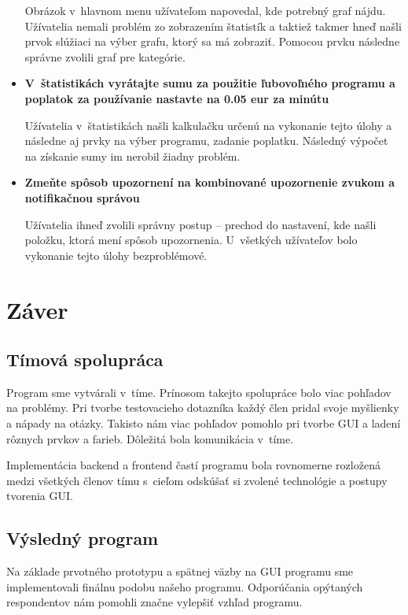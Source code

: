\documentclass[]{article}
\begin{document}
\begin{itemize}
	Obrázok v~hlavnom menu užívateľom napovedal, kde potrebný graf nájdu. Užívatelia nemali problém zo zobrazením štatistík a taktiež takmer hneď našli prvok slúžiaci na výber grafu, ktorý sa má zobraziť. Pomocou prvku následne správne zvolili graf pre kategórie.
	
	\item \textbf{V~štatistikách vyrátajte sumu za použitie ľubovoľného programu a poplatok za používanie nastavte na 0.05 eur za minútu}
	
	Užívatelia v~štatistikách našli kalkulačku určenú na vykonanie tejto úlohy a následne aj prvky na výber programu, zadanie poplatku. Následný výpočet na získanie sumy im nerobil žiadny problém.
	
	\item \textbf{Zmeňte spôsob upozornení na kombinované upozornenie zvukom a notifikačnou správou}
	
	Užívatelia ihneď zvolili správny postup -- prechod do nastavení, kde našli položku, ktorá mení spôsob upozornenia. U~všetkých užívateľov bolo vykonanie tejto úlohy bezproblémové.
	
	
\end{itemize}

\newpage

\section{Záver}

\subsection{Tímová spolupráca}
Program sme vytvárali v~tíme. Prínosom takejto spolupráce bolo viac pohľadov na problémy. Pri tvorbe testovacieho dotazníka každý člen pridal svoje myšlienky a nápady na otázky. Takisto nám viac pohľadov pomohlo pri tvorbe GUI a ladení rôznych prvkov a farieb. Dôležitá bola komunikácia v~tíme. 

Implementácia backend a frontend častí programu bola rovnomerne rozložená medzi všetkých členov tímu s~cieľom odskúšať si zvolené technológie a postupy tvorenia GUI.

\subsection{Výsledný program}
Na základe prvotného prototypu a spätnej väzby na GUI programu sme implementovali finálnu podobu našeho programu. Odporúčania opýtaných respondentov nám pomohli značne vylepšiť vzhľad programu.
\end{document}
